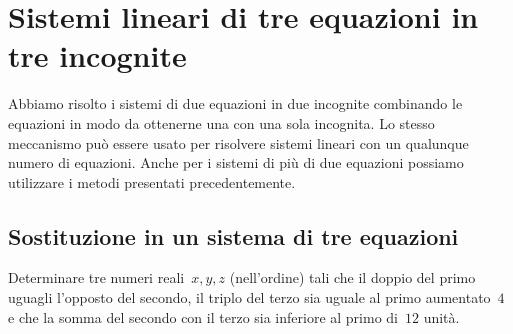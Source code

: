 \section{Sistemi lineari di tre equazioni in tre incognite}
\label{sec:compl1_sistemitreeq}

Abbiamo risolto i sistemi di due equazioni in due incognite combinando le 
equazioni in modo da ottenerne una con una sola incognita.
Lo stesso meccanismo può essere usato per risolvere sistemi lineari con un 
qualunque numero di equazioni.
Anche per i sistemi di più di due equazioni possiamo utilizzare i metodi 
presentati precedentemente.

\subsection{Sostituzione in un sistema di tre equazioni}

\begin{problema}{}{}
Determinare tre numeri reali~\(x, y, z\) (nell'ordine) tali
che il doppio del primo uguagli l'opposto del secondo,
il triplo del terzo sia uguale al primo aumentato~\(4\)
e che la somma del secondo con il terzo sia inferiore al primo di~\(12\) 
unità.
\end{problema}

